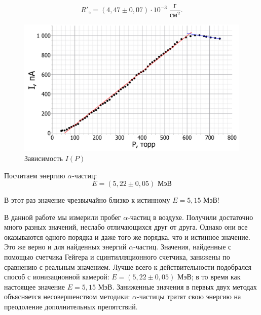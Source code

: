 \begin{enumerate}
		\begin{equation*}
			R'_\text{э} = (4,47 \pm 0,07) \cdot 10^{-3} \;\dfrac{\text{г}}{\text{см}^2}.
		\end{equation*}		
	
		
		\begin{figure}[h!]
			\centering
			\includegraphics[width=\linewidth]{Pictures/Ionization_Plot.pdf}
			\caption{Зависимость $I(P)$}
		\end{figure}
	
		Посчитаем энергию $\alpha$-частиц:
		\begin{equation*}
			\boxed{E = (5,22 \pm 0,05) \text{ МэВ}}
		\end{equation*}
	
		В этот раз значение чрезвычайно близко к истинному $E = 5,15$ МэВ! 

	\end{enumerate}

	\newpage
	В данной работе мы измерили пробег $\alpha$-частиц в воздухе. Получили достаточно много разных значений, неслабо отличающихся друг от друга. Однако они все оказываются одного порядка и даже того же порядка, что и истинное значение. Это же верно и для найденных энергий $\alpha$-частиц. Значения, найденные с помощью счетчика Гейгера и сцинтилляционного счетчика, занижены по сравнению с реальным значением. Лучше всего к действительности подобрался способ с ионизационной камерой: $E = (5,22 \pm 0,05)$ МэВ; в то время как настоящее значение $E = 5,15$ МэВ. Заниженные значения в первых двух методах объясняется несовершенством методики: $\alpha$-частицы тратят свою энергию на преодоление дополнительных препятствий. 
	
